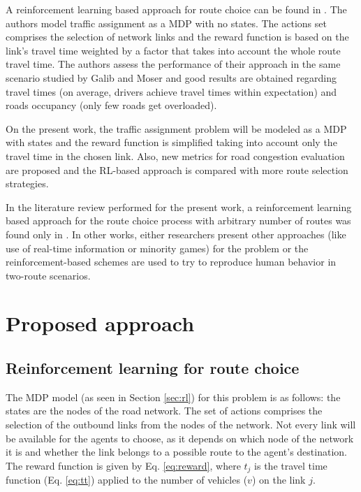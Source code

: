 \documentclass{RITA}
\newcommand{\travTime}{\ensuremath{t_j}} 	%
\newcommand{\veh}{\ensuremath{v}}		%
\begin{document}
A reinforcement learning based approach for route choice can be found in \cite{Tavares&Bazzan2012}. The authors model traffic assignment as a MDP with no states. The actions set comprises the selection of network links and the reward function is based on the link's travel time weighted by a factor that takes into account the whole route travel time. The authors assess the performance of their approach in the same scenario studied by Galib and Moser \cite{Galib&Moser2011} and good results are obtained regarding travel times (on average, drivers achieve travel times within expectation) and roads occupancy (only few roads get overloaded). 

On the present work, the traffic assignment problem will be modeled as a MDP with states and the reward function is simplified taking into account only the travel time in the chosen link. Also, new metrics for road congestion evaluation are proposed and the RL-based approach is compared with more route selection strategies. %

In the literature review performed for the present work, a reinforcement learning based approach for the route choice process with arbitrary number of routes was found only in \cite{Tavares&Bazzan2012}. In other works, either researchers present other approaches (like use of real-time information or minority games) for the problem or the reinforcement-based schemes are used to try to reproduce human behavior in two-route scenarios.

\section{Proposed approach}
\label{sec:proposal}

\subsection{Reinforcement learning for route choice}

The MDP model (as seen in Section \ref{sec:rl}) for this problem is as follows: the states are the nodes of the road network. The set of actions comprises the selection of the outbound links from the nodes of the network. Not every link will be available for the agents to choose, as it depends on which node of the network it is and whether the link belongs to a possible route to the agent's destination. The reward function is given by Eq. \eqref{eq:reward}, where $\travTime$ is the travel time function (Eq. \eqref{eq:tt}) applied to the number of vehicles ($\veh$) on the link $j$.
\end{document}
